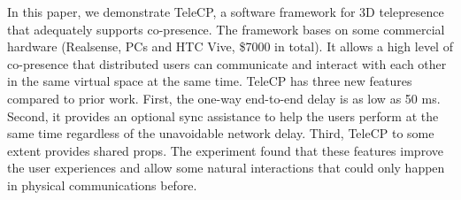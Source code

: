 \documentclass[sigchi, review]{acmart}
\begin{document}
\begin{CJK*}{UTF8}{gbsn}
In this paper, we demonstrate TeleCP, a software framework for 3D telepresence that adequately supports co-presence. The framework bases on some commercial hardware (Realsense, PCs and HTC Vive, \$7000 in total). It allows a high level of co-presence that distributed users can communicate and interact with each other in the same virtual space at the same time. TeleCP has three new features compared to prior work. First, the one-way end-to-end delay is as low as 50 ms. Second, it provides an optional sync assistance to help the users perform at the same time regardless of the unavoidable network delay. Third, TeleCP to some extent provides shared props. The experiment found that these features improve the user experiences and allow some natural interactions that could only happen in physical communications before.




\end{CJK*}
\end{document}
